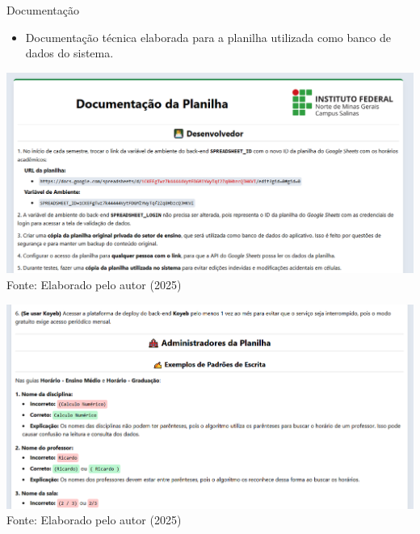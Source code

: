 \begin{frame}{Documentação}
    \begin{itemize}
        \item Documentação técnica elaborada para a planilha utilizada como banco de dados do sistema.
    \end{itemize}
    \begin{minipage}{0.48\textwidth}
        \centering
        \includegraphics[width=1\textwidth]{figuras/doc-1.png}
        \small Fonte: Elaborado pelo autor (2025)
    \end{minipage}
    \hfill
    \begin{minipage}{0.48\textwidth}
        \centering
        \includegraphics[width=1\textwidth]{figuras/doc-2.png}
        \small Fonte: Elaborado pelo autor (2025)
    \end{minipage}
\end{frame}


